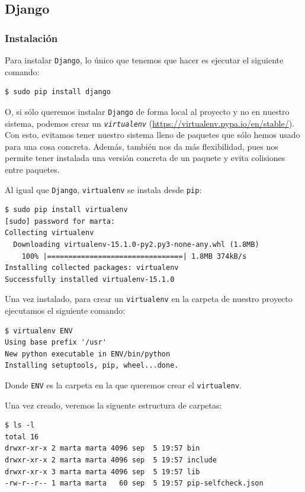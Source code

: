 \subsection{Django}
\subsubsection{Instalación}
Para instalar \texttt{Django}, lo único que tenemos que hacer es ejecutar el siguiente comando:

\begin{verbatim}
$ sudo pip install django
\end{verbatim}

O, si sólo queremos instalar \texttt{Django} de forma local al proyecto y no en nuestro sistema, podemos crear un \texttt{\textit{virtualenv}} (\url{https://virtualenv.pypa.io/en/stable/}). Con esto, evitamos tener nuestro sistema lleno de paquetes que sólo hemos usado para una cosa concreta. Además, también nos da más flexibilidad, pues nos permite tener instalada una versión concreta de un paquete y evita colisiones entre paquetes. 

Al igual que \texttt{Django}, \texttt{virtualenv} se instala desde \texttt{pip}:

\begin{verbatim}
$ sudo pip install virtualenv
[sudo] password for marta: 
Collecting virtualenv
  Downloading virtualenv-15.1.0-py2.py3-none-any.whl (1.8MB)
    100% |================================| 1.8MB 374kB/s 
Installing collected packages: virtualenv
Successfully installed virtualenv-15.1.0
\end{verbatim}

Una vez instalado, para crear un \texttt{virtualenv} en la carpeta de nuestro proyecto ejecutamos el siguiente comando:

\begin{verbatim}
$ virtualenv ENV
Using base prefix '/usr'
New python executable in ENV/bin/python
Installing setuptools, pip, wheel...done.
\end{verbatim}

Donde \texttt{ENV} es la carpeta en la que queremos crear el \texttt{virtualenv}. 

Una vez creado, veremos la siguente estructura de carpetas:

\begin{verbatim}
$ ls -l
total 16
drwxr-xr-x 2 marta marta 4096 sep  5 19:57 bin
drwxr-xr-x 2 marta marta 4096 sep  5 19:57 include
drwxr-xr-x 3 marta marta 4096 sep  5 19:57 lib
-rw-r--r-- 1 marta marta   60 sep  5 19:57 pip-selfcheck.json
\end{verbatim}

